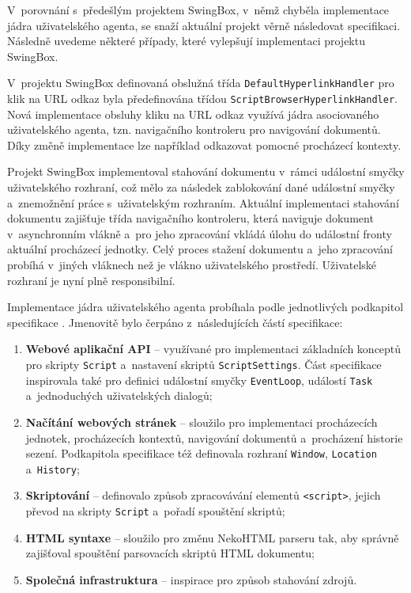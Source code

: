 V~porovnání s~předešlým projektem SwingBox, v~němž chyběla implementace jádra uživatelského agenta, se snaží aktuální projekt věrně následovat specifikaci. Následně uvedeme některé případy, které vylepšují implementaci projektu SwingBox. 
 
V~projektu SwingBox definovaná obslužná třída \texttt{DefaultHyperlinkHandler} pro klik na URL odkaz byla předefinována třídou \texttt{ScriptBrowserHyperlinkHandler}. Nová implementace obsluhy kliku na URL odkaz využívá jádra asociovaného uživatelského agenta, tzn. navigačního kontroleru pro navigování dokumentů. Díky změně implementace lze například odkazovat pomocné procházecí kontexty.

Projekt SwingBox implementoval stahování dokumentu v~rámci událostní smyčky uživatelského rozhraní, což mělo za následek zablokování dané událostní smyčky a~znemožnění práce s~uživatelským rozhraním. Aktuální implementaci stahování dokumentu zajišťuje třída navigačního kontroleru, která naviguje dokument v~asynchronním vlákně a~pro jeho zpracování vkládá úlohu do událostní fronty aktuální procházecí jednotky. Celý proces stažení dokumentu a~jeho zpracování probíhá v~jiných vláknech než je vlákno uživatelského prostředí. Uživatelské rozhraní je nyní plně responsibilní.  

Implementace jádra uživatelského agenta probíhala podle jednotlivých podkapitol specifikace \cite{Bibliography.HTML5.TableOfContents}. Jmenovitě bylo čerpáno z~následujících částí specifikace:

\begin{enumerate}
  \item \textbf{Webové aplikační API} \cite{Bibliography.HTML5.WebAPIs} -- využívané pro implementaci základních konceptů pro skripty \texttt{Script} a~nastavení skriptů \texttt{ScriptSettings}. Část specifikace inspirovala také pro definici událostní smyčky \texttt{EventLoop}, událostí \texttt{Task} a~jednoduchých uživatelských dialogů;
  \item \textbf{Načítání webových stránek} \cite{Bibliography.HTML5.Browsers} -- sloužilo pro implementaci procházecích jednotek, procházecích kontextů, navigování dokumentů a~procházení historie sezení. Podkapitola specifikace též definovala rozhraní \texttt{Window}, \texttt{Location} a~\texttt{History};
  \item \textbf{Skriptování} \cite{Bibliography.HTML5.Scripting} -- definovalo způsob zpracovávání elementů \texttt{<script>}, jejich převod na skripty \texttt{Script} a~pořadí spouštění skriptů;
  \item \textbf{HTML syntaxe} \cite{Bibliography.HTML5.TheHtmlSyntax} -- sloužilo pro změnu NekoHTML parseru tak, aby správně zajišťoval spouštění parsovacích skriptů HTML dokumentu;
  \item \textbf{Společná infrastruktura} \cite{Bibliography.HTML5.Commoninfrastructure} -- inspirace pro způsob stahování zdrojů.
\end{enumerate}

